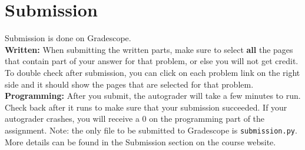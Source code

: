 \documentclass{article}
\theoremstyle{case}
\theoremstyle{definition}
\begin{document}
\section*{Submission}
Submission is done on Gradescope. \\

\textbf{Written:} When submitting the written parts, make sure to select \textbf{all} the pages that contain part of your answer for that problem, or else you will not get credit. To double check after submission, you can click on each problem link on the right side and it should show the pages that are selected for that problem. \\

\textbf{Programming:} After you submit, the autograder will take a few minutes to run. Check back after it runs to make sure that your submission succeeded. If your autograder crashes, you will receive a 0 on the programming part of the assignment. Note: the only file to be submitted to Gradescope is \texttt{submission.py}.\\

More details can be found in the Submission section on the course website.

\end{document}
